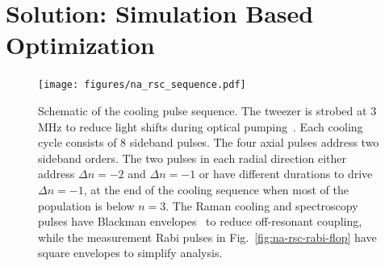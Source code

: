 \section{Solution: Simulation Based Optimization}
\label{ch:rsc:simulation}

\begin{figure}
  \centering
  \texttt{[image: figures/na\_rsc\_sequence.pdf]}
  \caption[Simulation optimized Raman sideband cooling sequence for Sodium]{
    Schematic of the cooling pulse sequence. The tweezer is strobed at 3 MHz to
    reduce light shifts during optical pumping~\cite{hutzler_eliminating_2017}.
    Each cooling cycle consists of $8$ sideband pulses.
    The four axial pulses address two sideband orders.
    The two pulses in each radial direction either address $\Delta n=-2$ and $\Delta n=-1$
    or have different durations to drive $\Delta n=-1$,
    at the end of the cooling sequence when most of the population is below $n=3$.
    The Raman cooling and spectroscopy pulses have Blackman envelopes~\cite{kasevich_laser_1992}
    to reduce off-resonant coupling,
    while the measurement Rabi pulses in Fig.~\ref{fig:na-rsc-rabi-flop}
    have square envelopes to simplify analysis.
    \label{fig:na-rsc-sequence}}
\end{figure}

